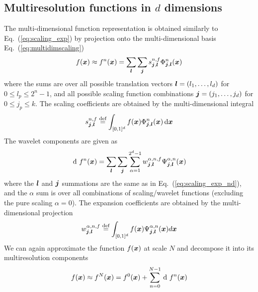 \subsection{Multiresolution functions in $d$ dimensions}
The multi-dimensional function representation is obtained similarly to
Eq.~(\ref{eq:scaling_exp}) by projection onto the multi-dimensional basis
Eq.~(\ref{eq:multidimscaling})
\begin{equation}
    \label{eq:scaling_exp_nd}
    f(\boldsymbol x) \approx {f}^{n}(\boldsymbol x) = \sum_{\boldsymbol l}
    \sum_{\boldsymbol j} s^{n,f}_{\boldsymbol j,\boldsymbol l} 
    \Phi^n_{\boldsymbol j,\boldsymbol l}(\boldsymbol x)
\end{equation}
where the sums are over all possible translation vectors 
$\boldsymbol l = (l_1,\dots,l_d)$ for $0\leq l_p\leq 2^n-1$, and all possible 
scaling function combinations $\boldsymbol j = (j_1,\dots,j_d)$ for 
$0\leq j_p\leq k$. The scaling coefficients are obtained by the
multi-dimensional integral
\begin{equation}
    \label{eq:waveletproj_nd}
    s^{n,f}_{\boldsymbol j,\boldsymbol l} \stackrel{\text{def}}{\hbox{=}}
    \int_{[0,1]^d}f(\boldsymbol x)\Phi^n_{\boldsymbol j,
    \boldsymbol l}(\boldsymbol x)\,\mathrm{d} \boldsymbol x
\end{equation}
The wavelet components are given as
\begin{equation}
    \waveletrep{f}{n}(\bs{x}) = \sum_{\bs{l}} \sum_{\bs{j}} 
    \sum_{\alpha=1}^{2^d-1}\waveletcoef^{\alpha,n,f}_{\bs{j},\bs{l}} 
	\waveletnd^{\alpha,n}_{\bs{j},\bs{l}}(\bs{x})
\end{equation}
where the $\boldsymbol l$ and $\boldsymbol j$ summations are the same as in
Eq.~(\ref{eq:scaling_exp_nd}), and the $\alpha$ sum is over all combinations of
scaling/wavelet functions (excluding the pure scaling $\alpha=0$).
The expansion coefficients are obtained by the multi-dimensional projection
\begin{equation}
    w^{\alpha,n,f}_{\boldsymbol j,\boldsymbol l} \stackrel{\text{def}}{\hbox{=}}
	\int_{[0,1]^d}f(\boldsymbol x)\Psi^{\alpha,n}_{\boldsymbol j,
	\boldsymbol l}(\boldsymbol x)d\boldsymbol x
\end{equation}
We can again approximate the function $f(\boldsymbol x)$ at scale $N$ and 
decompose it into its multiresolution components
\begin{equation}
    f(\bs{x}) \approx \scalingrep{f}{N}(\bs{x}) = 
    \scalingrep{f}{0}(\bs{x}) + \sum_{n=0}^{N-1} \waveletrep{f}{n}(\bs{x})
\end{equation}

